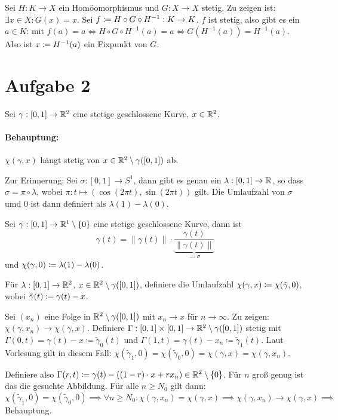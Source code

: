 \documentclass{article}
\begin{document}
Sei $H: K\to X$ ein Homöomorphismus und $G:X\to X$ stetig. Zu zeigen ist: $\exists x\in X: G(x)=x$. Sei $f\mathrel{\mbox{$\coloneqq$}} H\circ G \circ H^{-1} : K\to K$. $f$ ist stetig, also gibt es ein $a\in K$: mit $f(a)=a \iff H\circ G \circ H^{-1}(a) = a \iff G(H^{-1}(a)) = H^{-1}(a)$. Also ist $x\mathrel{\mbox{$\coloneqq$}} H^{-1}(a)$ ein Fixpunkt von $G$.

\section*{Aufgabe 2}

Sei $\gamma:[0,1]\to \mathbb{R}^2$ eine stetige geschlossene Kurve, $x\in \mathbb{R}^2$.

\paragraph{Behauptung:} $\chi(\gamma,x)$ hängt stetig von $x\in \mathbb{R}^2\setminus\gamma([0,1])$ ab.

Zur Erinnerung: Sei $\sigma: [0,1]\to S^1$, dann gibt es genau ein $\lambda:[0,1]\to \mathbb{R}$, so dass $\sigma = \pi \circ \lambda$, wobei $\pi:t\mapsto (\cos(2\pi t), \sin(2\pi t))$ gilt. Die Umlaufzahl von $\sigma$ umd $0$ ist dann definiert als $\lambda(1)-\lambda(0)$.

Sei $\gamma:[0,1]\to \mathbb{R}^1\setminus\{0\}$ eine stetige geschlossene Kurve, dann ist 
\[
\gamma(t) = \|\gamma(t)\| \cdot \underbrace{\frac{\gamma(t)}{\|\gamma(t)\|}}_{\eqqcolon \sigma}
\]
und $\chi(\gamma,0) \mathrel{\mbox{$\coloneqq$}} \lambda(1)-\lambda(0)$.

Für $\lambda:[0,1]\to \mathbb{R}^2$, $x\in \mathbb{R}^2\setminus\gamma([0,1])$, definiere die Umlaufzahl $\chi(\gamma,x)\mathrel{\mbox{$\coloneqq$}} \chi(\tilde\gamma,0)$, wobei $\tilde\gamma(t) \mathrel{\mbox{$\coloneqq$}} \gamma(t) -x$.

Sei $(x_n)$ eine Folge in $\mathbb{R}^2\setminus\gamma([0,1])$ mit $x_n \to x$ für $n\to \infty$. Zu zeigen: $\chi(\gamma,x_n) \to \chi(\gamma,x)$. Definiere
$ \Gamma: [0,1]\times[0,1]\to \mathbb{R}^2\setminus\gamma([0,1])$ stetig mit $\Gamma(0,t) = \gamma(t)-x\coloneqq \tilde\gamma_0(t)$ und $\Gamma(1,t) = \gamma(t)-x_n\coloneqq \tilde\gamma_1(t)$. Laut Vorlesung gilt in diesem Fall: $\chi(\tilde\gamma_1,0)=\chi(\tilde\gamma_0,0)=\chi(\gamma,x)=\chi(\gamma,x_n)$.

Definiere also $\Gamma(r,t)\mathrel{\mbox{$\coloneqq$}} \gamma(t) - ( (1-r)\cdot x + r x_n) \in \mathbb{R}^2\setminus\{0\}$. Für $n$ groß genug ist das die gesuchte Abbildung. Für alle $n\ge N_0$ gilt dann: $\chi(\tilde\gamma_1,0)=\chi(\tilde\gamma_0,0) \implies \forall n\ge N_0: \chi(\gamma,x_n)=\chi(\gamma,x) \implies \chi(\gamma,x_n)\to \chi(\gamma,x) \implies$ Behauptung.
\end{document}
